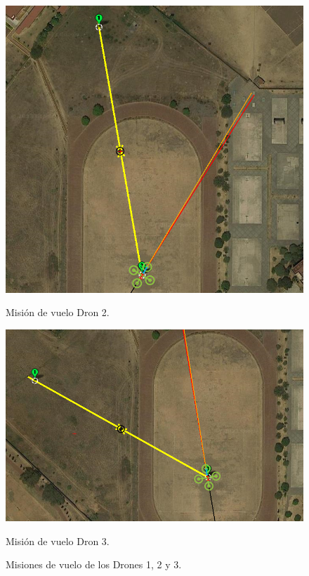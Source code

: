 \begin{figure}[h!]
\begin{minipage}{0.3\linewidth}
        \includegraphics[width=\linewidth]{imagenes/esq_2_2.png}
        \caption{Misión de vuelo Dron 2.}
        \label{fig:subfig2}
    \end{minipage}
    \hfill
    \begin{minipage}{0.3\linewidth}
        \centering
        \includegraphics[width=1.1\linewidth]{imagenes/esq_2_3.png}
        \caption{Misión de vuelo Dron 3.}
        \label{fig:subfig3}
    \end{minipage}
    \caption{Misiones de vuelo de los Drones 1, 2 y 3.}
    \label{fig:enter-label}
\end{figure}

